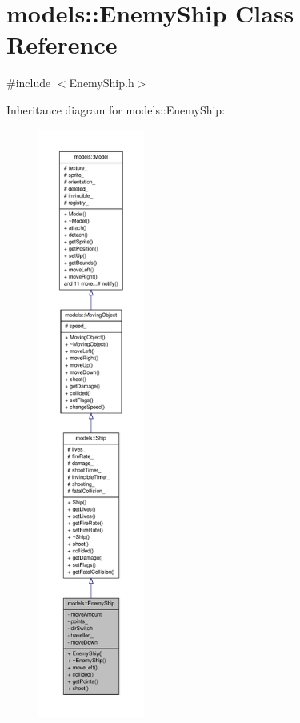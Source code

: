 \hypertarget{classmodels_1_1EnemyShip}{\section{models\-:\-:\-Enemy\-Ship \-Class \-Reference}
\label{d1/d22/classmodels_1_1EnemyShip}
}


{\ttfamily \#include $<$\-Enemy\-Ship.\-h$>$}



\-Inheritance diagram for models\-:\-:\-Enemy\-Ship\-:
\nopagebreak
\begin{figure}[H]
\begin{center}
\leavevmode
\includegraphics[height=550pt]{d8/dfa/classmodels_1_1EnemyShip__inherit__graph}
\end{center}
\end{figure}



